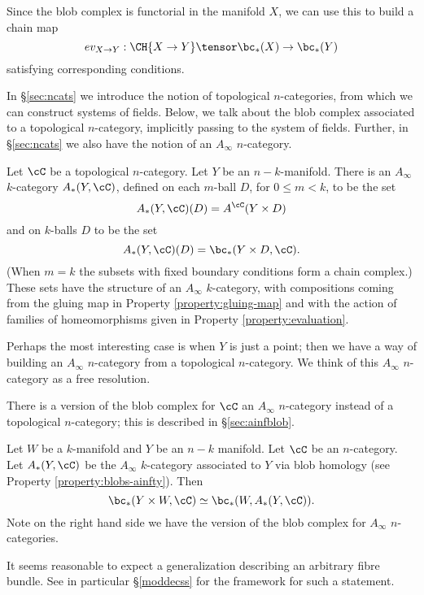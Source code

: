 Since the blob complex is functorial in the manifold $X$, we can use this to build a chain map
$$ev_{X \to Y} : \CH{X \to Y} \tensor \bc_*(X) \to \bc_*(Y)$$
satisfying corresponding conditions.

In \S \ref{sec:ncats} we introduce the notion of topological $n$-categories, from which we can construct systems of fields. Below, we talk about the blob complex associated to a topological $n$-category, implicitly passing to the system of fields. Further, in \S \ref{sec:ncats} we also have the notion of an $A_\infty$ $n$-category.

\begin{property}
\label{property:blobs-ainfty}
Let $\cC$ be  a topological $n$-category.  Let $Y$ be an $n{-}k$-manifold. 
There is an $A_\infty$ $k$-category $A_*(Y, \cC)$, defined on each $m$-ball $D$, for $0 \leq m < k$, to be the set $$A_*(Y,\cC)(D) = A^\cC(Y \times D)$$ and on $k$-balls $D$ to be the set $$A_*(Y, \cC)(D) = \bc_*(Y \times D, \cC).$$ (When $m=k$ the subsets with fixed boundary conditions form a chain complex.) These sets have the structure of an $A_\infty$ $k$-category, with compositions coming from the gluing map in Property \ref{property:gluing-map} and with the action of families of homeomorphisms given in Property \ref{property:evaluation}.
\end{property}
\begin{rem}
Perhaps the most interesting case is when $Y$ is just a point; then we have a way of building an $A_\infty$ $n$-category from a topological $n$-category. We think of this $A_\infty$ $n$-category as a free resolution.
\end{rem}

There is a version of the blob complex for $\cC$ an $A_\infty$ $n$-category
instead of a topological $n$-category; this is described in \S \ref{sec:ainfblob}.

\begin{property}
\label{property:product}
Let $W$ be a $k$-manifold and $Y$ be an $n-k$ manifold. Let $\cC$ be an $n$-category.
Let $A_*(Y,\cC)$ be the $A_\infty$ $k$-category associated to $Y$ via blob homology (see Property \ref{property:blobs-ainfty}).
Then
\[
	\bc_*(Y\times W, \cC) \simeq \bc_*(W, A_*(Y,\cC)) .
\]
Note on the right hand side we have the version of the blob complex for $A_\infty$ $n$-categories.
\end{property}
It seems reasonable to expect a generalization describing an arbitrary fibre bundle. See in particular \S \ref{moddecss} for the framework for such a statement.

